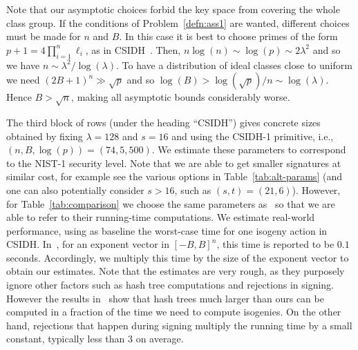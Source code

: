 \documentclass{llncs}
\begin{document}
Note that our asymptotic choices forbid the key space from covering the whole class group.
If the conditions of Problem~\ref{defn:ass1} are wanted, different choices must be made for $n$ and $B$.
In this case it is best to choose primes of the form $p+1 = 4\prod_{i=1}^n\ell_i$, as in CSIDH~\cite{CLMPR18}.
Then, $n\log(n)\sim\log(p)\sim 2\lambda^2$ and so we have  $n \sim \lambda^2 / \log(\lambda)$.
To have a distribution of ideal classes close to uniform we need $(2B+1)^n \gg \sqrt{p}$ and so $\log(B) > \log( \sqrt{p} )/n \sim \log(\lambda)$.
Hence $B > \sqrt{n}$, making all asymptotic bounds considerably worse.

The third block of rows (under the heading ``CSIDH'') gives concrete sizes obtained by fixing $\lambda=128$ and $s=16$ and using the CSIDH-1 primitive, i.e., $(n,B,\log(p)) = (74,5,500)$.
We estimate these parameters to correspond to the NIST-1 security level.
Note that we are able to get smaller signatures at similar cost, for example see the various options in Table~\ref{tab:alt-params} (and one can also potentially consider $s > 16$, such as $(s,t)=(21,6)$).
However, for Table~\ref{tab:comparison} we choose the same parameters as~\cite{CLMPR18} so that we are able to refer to their running-time computations.
We estimate real-world performance, using as baseline the worst-case time for one isogeny action in CSIDH.
In~\cite{CLMPR18}, for an exponent vector in $[-B,B]^n$, this time is reported to be $0.1$ seconds.
Accordingly, we multiply this time by the size of the exponent vector to obtain our estimates.
Note that the estimates are very rough, as they purposely ignore other factors such as hash tree computations and rejections in signing.
However the results in~\cite{10.1007/978-3-662-49384-7_15,sphincs+} show that hash trees much larger than ours can be computed in a fraction of the time we need to compute isogenies.
On the other hand, rejections that happen during signing multiply the running time by a small constant, typically less than $3$ on average.
\end{document}
